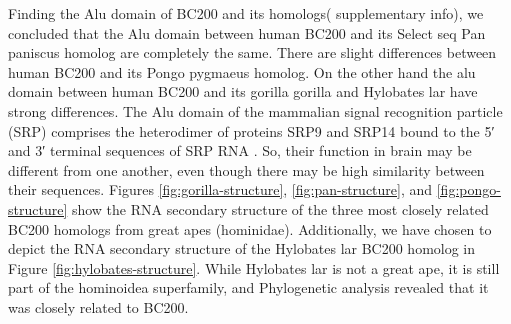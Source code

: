 \documentclass[conference]{IEEEtran}
\begin{document}
Finding the Alu domain of BC200 and its homologs( supplementary info), we concluded that the Alu domain between human BC200 and its Select seq Pan paniscus homolog are completely the same. There are slight differences between human BC200 and its Pongo pygmaeus homolog. On the other hand the alu domain between human BC200 and its gorilla gorilla and Hylobates lar have strong differences.
The Alu domain of the mammalian signal recognition particle (SRP) comprises the heterodimer of proteins SRP9 and SRP14 bound to the 5′ and 3′ terminal sequences of SRP RNA \cite{weichenrieder2000structure}. 
So, their function in brain may be different from one another, even though there may be high similarity between their sequences. 
Figures \ref{fig:gorilla-structure}, \ref{fig:pan-structure}, and \ref{fig:pongo-structure} show the RNA secondary structure of the three most closely related BC200 homologs from great apes (hominidae). 
Additionally, we have chosen to depict the RNA secondary structure of the Hylobates lar BC200 homolog in Figure \ref{fig:hylobates-structure}. 
While Hylobates lar is not a great ape, it is still part of the hominoidea superfamily, and Phylogenetic analysis revealed that it was closely related to BC200.
\end{document}
